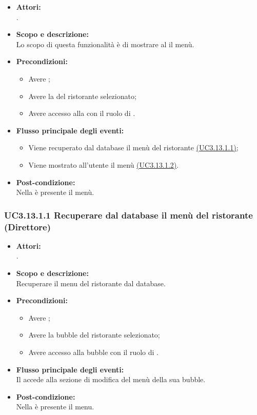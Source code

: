 \begin{itemize}
	\item \textbf{Attori:}
	\\.
	\item \textbf{Scopo e descrizione:} 
	\\Lo scopo di questa funzionalità è di mostrare al  il menù.
	\item \textbf{Precondizioni:}
	\begin{itemize}
		\item Avere ;
		\item Avere la  del ristorante selezionato;
		\item Avere accesso alla  con il ruolo di .
	\end{itemize}
	\item \textbf{Flusso principale degli eventi:}
	\begin{itemize}
		\item Viene recuperato dal database il menù del ristorante \hyperref[UC3.13.1.1]{(UC3.13.1.1)};
		\item Viene mostrato all'utente il menù \hyperref[UC3.13.1.2]{(UC3.13.1.2)}.
	\end{itemize}
	\item \textbf{Post-condizione:}
	\\Nella {} è presente il menù.
\end{itemize}

\subsubsection{UC3.13.1.1 Recuperare dal database il menù del ristorante (Direttore)} \label{UC3.13.1.1}

\begin{itemize}
	\item \textbf{Attori:}
	\\.
	\item \textbf{Scopo e descrizione:} 
	\\Recuperare il menu del ristorante dal database.
	\item \textbf{Precondizioni:}
	\begin{itemize}
		\item Avere ;
		\item Avere la bubble del ristorante selezionato;
		\item Avere accesso alla bubble con il ruolo di .
	\end{itemize}
	\item \textbf{Flusso principale degli eventi:}
	\\Il {} accede alla sezione di modifica del menù della sua bubble.
	\item \textbf{Post-condizione:}
	\\Nella {} è presente il menu.
\end{itemize}

